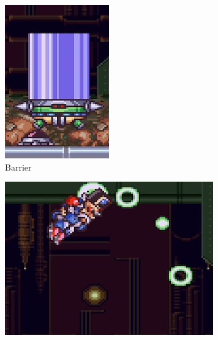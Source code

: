 \begin{figure}[htp]
\begin{minipage}{.5\linewidth}
\begin{subfigure}[t]{0.49\linewidth}
			\includegraphics[width=\linewidth]{figures/X2/Hunter_stages/Serges_barrier.png}
			\caption{Barrier}
		\end{subfigure}
		\begin{subfigure}{\linewidth}
			\centering
			\includegraphics[width=\linewidth]{figures/X2/Hunter_stages/Serges_beams.png}

\end{subfigure}
\end{minipage}
\end{figure}
